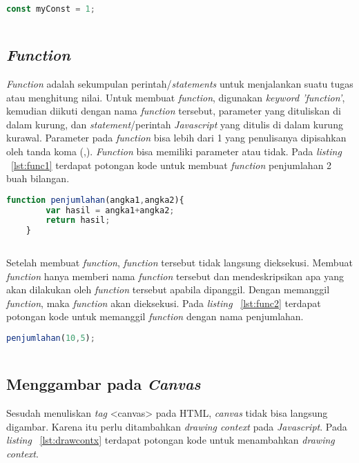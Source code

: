 \begin{lstlisting}[language=Javascript, caption=Deklarasi \textit{constant}, label={lst:const}]
	const myConst = 1;
	
\end{lstlisting}

\subsection{\textit{Function}}
\textit{Function} adalah sekumpulan perintah/\textit{statements} untuk menjalankan suatu tugas atau menghitung nilai. Untuk membuat \textit{function}, digunakan \textit{keyword 'function'}, kemudian diikuti dengan nama \textit{function} tersebut, parameter yang dituliskan di dalam kurung, dan \textit{statement}/perintah \textit{Javascript} yang ditulis di dalam kurung kurawal. Parameter pada \textit{function} bisa lebih dari 1 yang penulisanya dipisahkan oleh tanda koma (,). \textit{Function} bisa memiliki parameter atau tidak. Pada \textit{listing} ~\ref{lst:func1} terdapat potongan kode untuk membuat \textit{function} penjumlahan 2 buah bilangan.

\begin{lstlisting}[language=Javascript, caption=\textit{Function} penjumlahan 2 buah bilangan, label={lst:func1}]
	function penjumlahan(angka1,angka2){
		var hasil = angka1+angka2;
		return hasil;
	}
	
\end{lstlisting}

Setelah membuat \textit{function}, \textit{function} tersebut tidak langsung dieksekusi. Membuat \textit{function} hanya memberi nama \textit{function} tersebut dan mendeskripsikan apa yang akan dilakukan oleh \textit{function} tersebut apabila dipanggil. Dengan memanggil \textit{function}, maka \textit{function} akan dieksekusi. Pada \textit{listing} ~\ref{lst:func2} terdapat potongan kode untuk memanggil \textit{function} dengan nama penjumlahan.

\begin{lstlisting}[language=Javascript, caption=Memanggil \textit{function} penjumlahan, label={lst:func2}]
	penjumlahan(10,5);
	
\end{lstlisting}

\subsection{Menggambar pada \textit{Canvas}}
Sesudah menuliskan \textit{tag} <canvas> pada HTML, \textit{canvas} tidak bisa langsung digambar. Karena itu perlu ditambahkan \textit{drawing context} pada \textit{Javascript}. Pada \textit{listing} ~\ref{lst:drawcontx} terdapat potongan kode untuk menambahkan \textit{drawing context}.


